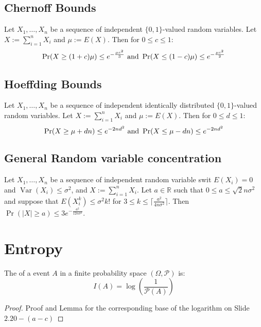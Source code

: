 \subsection{Chernoff Bounds}
Let $X_1,\ldots,X_n$ be a sequence of independent $\{0,1\}$-valued random variables. Let $X := \sum^n_{i=1}X_i$ and $\mu := E(X)$. Then for $0 \leq c \leq 1$:
\begin{equation*}
\operatorname{Pr}(X \geq (1+c)\mu)\leq e^{-\frac{\mu c^2}{3}}\\
\text{ and } \operatorname{Pr}(X \leq (1-c)\mu)\leq e^{-\frac{\mu c^2}{2}}
\end{equation*}
\subsection{Hoeffding Bounds}
Let $X_1,\ldots,X_n$ be a sequence of independent identically distributed $\{0,1\}$-valued random variables. Let $X := \sum^n_{i=1}X_i$ and $\mu := E(X)$. Then for $0 \leq d \leq 1$:
\begin{equation*}
\operatorname{Pr}(X \geq \mu +dn)\leq e^{-2nd^2}\\
\text{ and } \operatorname{Pr}(X \leq \mu -dn)\leq e^{-2nd^2}
\end{equation*}
\subsection{General Random variable concentration}
\begin{theorem}
Let $X_1,\ldots,X_n$ be a sequence of independent random variable swit $E(X_i) = 0$ and $\operatorname{Var}(X_i) \leq \sigma^2$, and $X:= \sum^{n}_{i=1}X_i$. Let $a \in \mathbb{R}$ such that $0\leq a\leq \sqrt{2}n\sigma^2$ and suppose that $E(X_i^k) \leq \sigma^2k!$ for $3 \leq k \leq \lceil\frac{a^2}{4n\sigma^2}\rceil$. Then $\operatorname{Pr}(|X| \geq a) \leq 3e^{-\frac{a^2}{12n\sigma^2}}$.
\end{theorem}
\section{Entropy}
The  of a event $A$ in a finite probability space $(\Omega,\mathcal{P})$ is:
\begin{equation*}
I(A) = \operatorname{log}(\frac{1}{\mathcal{P}(A)})
\end{equation*}

\begin{proof}
	Proof and Lemma for the corresponding base of the logarithm on Slide $2.20-(a-c)$
\end{proof}

